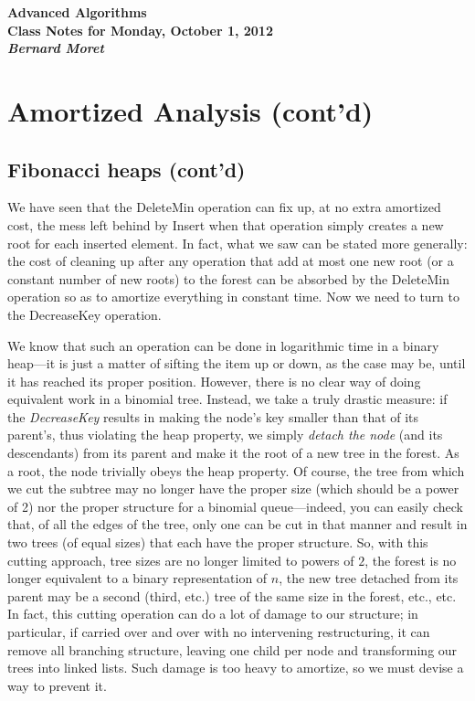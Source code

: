 \documentclass[11pt]{article}
\begin{document}
\begin{center}
  \LARGE\bf Advanced Algorithms\\

  \Large\sf
  Class Notes for Monday, October 1, 2012\\

  \it
  Bernard Moret
\end{center}

\bigskip

\section*{Amortized Analysis (cont'd)}

\subsection*{Fibonacci heaps (cont'd)}
We have seen that the DeleteMin operation can fix up,
at no extra amortized cost, the mess left behind by Insert
when that operation simply creates a new root for each inserted
element.  In fact, what we saw can be stated more generally:
the cost of cleaning up after any operation that add at most
one new root (or a constant number of new roots) to the forest
can be absorbed by the DeleteMin operation so as to amortize everything
in constant time.  Now we need to turn to the DecreaseKey operation.

We know that such an operation can be done in logarithmic time in
a binary heap---it is just a matter of sifting the item up or down,
as the case may be, until it has reached its proper position.
However, there is no clear way of doing equivalent work in a binomial tree.
Instead, we take a truly drastic measure: if the \emph{DecreaseKey} results
in making the node's key smaller than that of its parent's,
thus violating the heap property, we simply \emph{detach the node}
(and its descendants) from its parent and make it the root of a new tree
in the forest.  As a root, the node trivially obeys the heap property.
Of course, the tree from which we cut the subtree may no longer have the
proper size (which should be a power of 2) nor the proper structure for
a binomial queue---indeed, you can easily check that, of all the edges
of the tree, only one can be cut in that manner and result in two trees
(of equal sizes) that each have the proper structure.
So, with this cutting approach, tree sizes are no longer limited
to powers of $2$, the forest is no longer equivalent to a binary
representation of $n$, the new tree detached from its parent may be
a second (third, etc.) tree of the same size in the forest, etc., etc.
In fact, this cutting operation can do a lot of damage to our structure;
in particular, if carried over and over with no intervening restructuring,
it can remove all branching structure, leaving one child per node
and transforming our trees into linked lists.  Such damage is too heavy
to amortize, so we must devise a way to prevent it.
\end{document}
